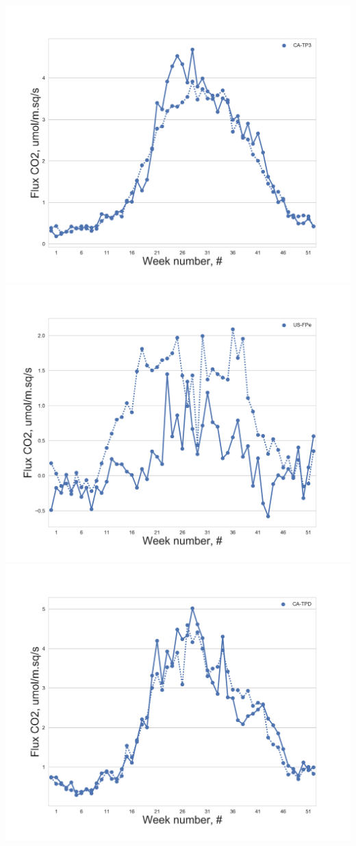 \documentclass{beamer}
\begin{document}
\begin{frame}
\begin{columns}[t]
\includegraphics[width=\textwidth]{F_ML_train_all/20.png}\\
\includegraphics[width=\textwidth]{F_ML_train_all/23.png}
\centering
\includegraphics[width=\textwidth]{F_ML_train_all/22.png}\\

\end{columns}
\end{frame}
\end{document}
